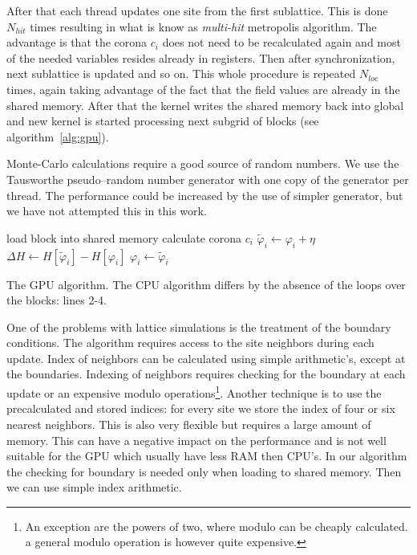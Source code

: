 \documentclass[a4paper]{llncs}
\newcommand{\vphi}{\varphi}
\begin{document}
After that each thread updates one site from the first sublattice. This is done
$N_{hit}$ times resulting in what is know as {\em multi-hit} metropolis
algorithm. The advantage is that the corona $c_i$ does not need to be
recalculated again and most of the needed variables resides already in
registers. Then after synchronization, next sublattice is updated and so on.
This whole procedure is repeated $N_{loc}$ times, again taking advantage of the
fact that the field values are already in the shared memory. After that the
kernel writes the shared memory back into global and new kernel is started
processing next subgrid of blocks (see algorithm~\ref{alg:gpu}).

Monte-Carlo calculations require a good source of random numbers. We use the
Tausworthe pseudo--random number generator\cite{howes_thomas07} with one copy
of the generator per thread. The performance could be increased by the use of
simpler generator, but we have not attempted this in this work.

\begin{algorithm}
\begin{algorithmic}[1]
\State load block  into shared memory
\State calculate corona $c_i$
\State $\widetilde{\vphi}_i \gets \vphi_i+\eta$
\State $\Delta H \gets H[\widetilde{\vphi}_i]-H[\vphi_i]$
\State $\vphi_i \gets \widetilde{\vphi}_i$
\EndIf
\EndFor
\EndFor
{}
\EndFor
\EndFor
\EndFor
\EndFor
\end{algorithmic}
\caption{\label{alg:gpu} The GPU algorithm. The CPU algorithm differs
  by the absence of the loops over the blocks: lines 2-4.}
\end{algorithm}

One of the problems with lattice simulations is the treatment of the boundary
conditions. The algorithm requires access to the site neighbors during each
update. Index of neighbors can be calculated using simple arithmetic's, except
at the boundaries. Indexing of neighbors requires checking for the boundary at
each update or an expensive modulo operations\footnote{An exception are the
powers of two, where modulo can be cheaply calculated. a general modulo
operation is however quite expensive. }. Another technique is to use the
precalculated and stored indices: for every site we store the index of four or
six nearest neighbors. This is also very flexible but requires a large amount
of memory. This can have a negative impact on the performance and is not well
suitable for the GPU which usually have less RAM then CPU's. In our algorithm
the checking for boundary is needed only when loading to shared memory. Then we
can use simple index arithmetic.
\end{document}
